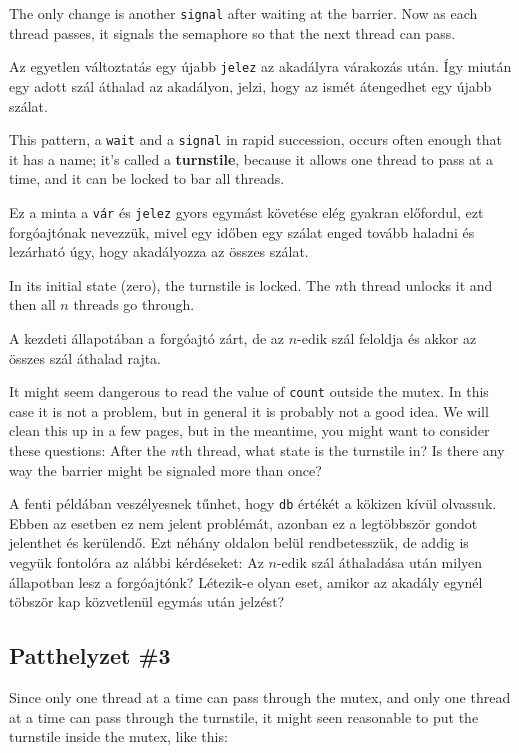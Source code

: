 \documentclass{book}
\newcommand{\clearemptydoublepage}{\newpage\cleardoublepage}
\begin{document}
The only change is another {\tt signal} after waiting
at the barrier.  Now as each thread passes, it signals the
semaphore so that the next thread can pass.

Az egyetlen változtatás egy újabb {\tt jelez} az akadályra várakozás után. Így miután
egy adott szál áthalad az akadályon, jelzi, hogy az ismét átengedhet egy újabb
szálat.

This pattern, a {\tt wait} and a {\tt signal} in rapid
succession, occurs often enough that it has a name;
it's called a {\bf turnstile}, because it allows one thread to pass
at a time, and it can be locked to bar all threads.

Ez a minta a {\tt vár} és {\tt jelez} gyors egymást követése elég gyakran előfordul, ezt
forgóajtónak nevezzük, mivel egy időben egy szálat enged tovább
haladni és lezárható úgy, hogy akadályozza az összes szálat.

In its initial state (zero), the turnstile is locked.  The $n$th
thread unlocks it and then all $n$ threads go through.

A kezdeti állapotában a forgóajtó zárt, de az $n$-edik szál feloldja és akkor az
összes szál áthalad rajta.

It might seem dangerous to read the value of {\tt count} outside the
mutex.  In this case it is not a problem, but in general it is
probably not a good idea.  We will clean this up in a few pages, but
in the meantime, you might want to consider these questions: After the
$n$th thread, what state is the turnstile in?  Is there any way the
barrier might be signaled more than once?

A fenti példában veszélyesnek tűnhet, hogy {\tt db} értékét a kökizen kívül
olvassuk. Ebben az esetben ez nem jelent problémát, azonban ez a legtöbbször
gondot jelenthet és kerülendő.
Ezt néhány oldalon belül rendbetesszük, de addig is vegyük fontolóra az
alábbi kérdéseket:
Az $n$-edik szál áthaladása után milyen állapotban lesz a forgóajtónk?
Létezik-e olyan eset, amikor az akadály egynél töbször kap közvetlenül
egymás után jelzést?

\clearemptydoublepage
\subsection{Patthelyzet \#3}

Since only one thread at a time can pass through the
mutex, and only one thread at a time can pass through
the turnstile, it might seen reasonable to put the
turnstile inside the mutex, like this:
\end{document}
